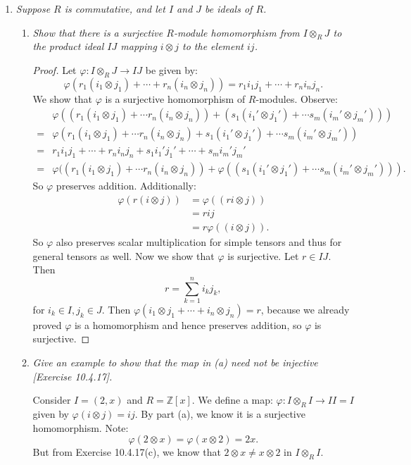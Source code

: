 \documentclass[12pt]{amsbook}
\theoremstyle{plain}
\numberwithin{section}{chapter}
\numberwithin{equation}{chapter}
\theoremstyle{definition}
\theoremstyle{remark}
\newcommand{\z}{\mathbb{Z}}
\newcommand{\bee}{\begin{equation}\begin{aligned}}
\newcommand{\eee}{\end{aligned}\end{equation}}
\newcommand{\tens}{\otimes}
\renewcommand{\phi}{\varphi}
\begin{document}
\begin{enumerate}[label=\arabic*.]
\item \textit{Suppose $R$ is commutative, and let $I$ and $J$ be ideals of $R$. }

\begin{enumerate}
\item \textit{Show that there is a surjective $R$-module homomorphism from $I \tens_R J$ to the product ideal $IJ$ mapping $i \tens j$ to the element $ij$. }

\begin{proof}
Let $\phi:I \tens_R J \to IJ$ be given by:
 $$
 \phi(r_1(i_1 \tens j_1) + \cdots + r_n(i_n \tens j_n)) = r_1i_1j_1 + \cdots + r_ni_nj_n.
 $$
  We show that $\phi$ is a surjective homomorphism of $R$-modules. Observe:
\bee
&\phi((r_1(i_1 \tens j_1) + \cdots r_n(i_n \tens j_n)) + (s_1(i_1' \tens j_1') + \cdots s_m(i_m' \tens j_m')))\\
= &\phi(r_1(i_1 \tens j_1) + \cdots r_n(i_n \tens j_n)+ s_1(i_1' \tens j_1') + \cdots s_m(i_m' \tens j_m'))\\
 = &r_1i_1j_1 + \cdots + r_ni_nj_n + s_1i_1'j_1' + \cdots + s_mi_m'j_m'\\
= &\phi((r_1(i_1 \tens j_1) + \cdots r_n(i_n \tens j_n)) + \phi((s_1(i_1' \tens j_1') + \cdots s_m(i_m' \tens j_m'))).
\eee
So $\phi$ preserves addition. Additionally:
\bee
\phi(r(i \tens j)) 
&= \phi((ri \tens j))\\
&= rij\\
&= r\phi((i \tens j)).
\eee
So $\phi$ also preserves scalar multiplication for simple tensors and thus for general tensors as well. Now we show that $\phi$ is surjective. Let $r \in IJ$. Then 
$$
r = \sum_{k = 1}^n i_kj_k,
$$ 
for $i_k \in I,j_k \in J$. Then $\phi(i_1 \tens j_1 + \cdots + i_n \tens j_n) = r$, because we already proved $\phi$ is a homomorphism and hence preserves addition, so $\phi$ is surjective. 
\end{proof}

\item \textit{Give an example to show that the map in (a) need not be injective [Exercise 10.4.17]. }


Consider $I = (2,x)$ and $R = \z[x]$. We define a map: $\phi:I \tens_R I \to II = I$ given by $\phi(i \tens j) = ij$. By part (a), we know it is a surjective homomorphism. Note:
$$
\phi(2 \tens x) = \phi(x \tens 2) = 2x.
$$
But from Exercise 10.4.17(c), we know that $2 \tens x \neq x \tens 2$ in $I \tens_R I$. 

\end{enumerate}
\end{enumerate}
\end{document}
